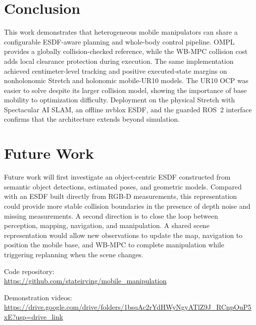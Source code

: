 \documentclass[conference]{IEEEtran}
\begin{document}
\section{Conclusion}

This work demonstrates that heterogeneous mobile manipulators can share a
configurable ESDF-aware planning and whole-body control pipeline.  OMPL provides
a globally collision-checked reference, while the WB-MPC collision cost adds
local clearance protection during execution.  The same implementation achieved
centimeter-level tracking and positive executed-state margins on nonholonomic
Stretch and holonomic mobile-UR10 models.  The UR10 OCP was easier to solve
despite its larger collision model, showing the importance of base mobility to
optimization difficulty.  Deployment on the physical Stretch with Spectacular
AI SLAM, an offline nvblox ESDF, and the guarded ROS~2 interface confirms that
the architecture extends beyond simulation.

\section{Future Work}

Future work will first investigate an object-centric ESDF constructed from
semantic object detections, estimated poses, and geometric models.  Compared
with an ESDF built directly from RGB-D measurements, this representation could
provide more stable collision boundaries in the presence of depth noise and
missing measurements.  A second direction is to close the loop between perception,
mapping, navigation, and manipulation.  A shared scene representation would
allow new observations to update the map, navigation to position the mobile
base, and WB-MPC to complete manipulation while triggering replanning when the
scene changes.

\appendix

\noindent Code repository:\\
\url{https://github.com/stateirving/mobile_manipulation}

\noindent Demonstration videos:\\
\url{https://drive.google.com/drive/folders/1bsqAc2rYdHWyNgyATlZ9J_RCnpOuP5xE?usp=drive_link}

\balance


\end{document}
